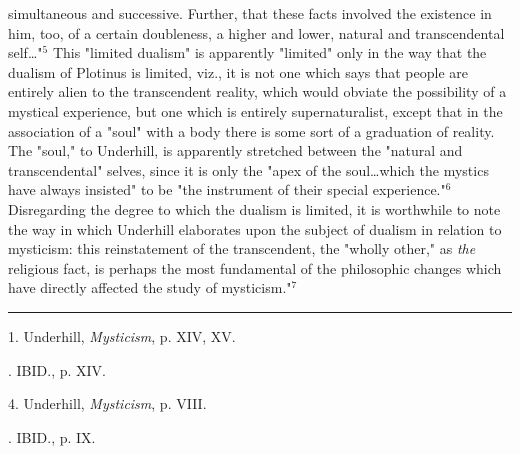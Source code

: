simultaneous and successive. Further, that these facts
involved the existence in him, too, of a certain doubleness,
a higher and lower, natural and transcendental self\dots"$^{5}$
This "limited dualism" is apparently "limited" only in the
way that the dualism of Plotinus is limited, viz., it is not
one which says that people are entirely alien to the transcendent
reality, which would obviate the possibility of a
mystical experience, but one which is entirely supernaturalist,
except that in the association of a "soul" with a body
there is some sort of a graduation of reality. The "soul," to
Underhill, is apparently stretched between the "natural and
transcendental" selves, since it is only the "apex of the
soul\dots which the mystics have always insisted" to be "the
instrument of their special experience."$^{6}$ Disregarding the
degree to which the dualism is limited, it is worthwhile to
note the way in which Underhill elaborates upon the subject
of dualism in relation to mysticism: this reinstatement of
the transcendent, the "wholly other," as \textit{the} religious fact,
is perhaps the most fundamental of the philosophic changes
which have directly affected the study of mysticism."$^{7}$\par
\vspace*{\fill}
\noindent\rule{0.25\textwidth}{0.4pt}\par
1. Underhill, \textit{Mysticism}, p. XIV, XV.\par
[2, 3]. IBID., p. XIV.\par
4. Underhill, \textit{Mysticism}, p. VIII.\par
[5, 6, 7]. IBID., p. IX.\par

\newpage

